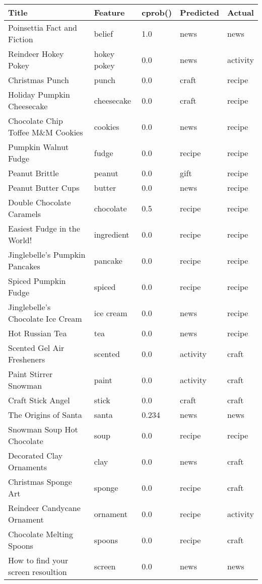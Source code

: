 \documentclass[letterpaper,11pt]{report}
\begin{document}
\begin{savenotes}
\begin{table}[htbp]
	\centering
    \begin{tabular}{|p{8cm}|l|l|l|l|}
    \hline
    \textbf{Title} & \textbf{Feature} & \textbf{cprob()} & \textbf{Predicted} & \textbf{Actual} \\ \hline
Poinsettia Fact and Fiction&belief&1.0&news&news\\ \hline
Reindeer Hokey Pokey&hokey pokey&0.0&news&activity\\ \hline
Christmas Punch&punch&0.0&craft&recipe\\ \hline
Holiday Pumpkin Cheesecake&cheesecake&0.0&craft&recipe\\ \hline
Chocolate Chip Toffee M\&M Cookies&cookies&0.0&news&recipe\\ \hline
Pumpkin Walnut Fudge&fudge&0.0&recipe&recipe\\ \hline
Peanut Brittle&peanut&0.0&gift&recipe\\ \hline
Peanut Butter Cups&butter&0.0&news&recipe\\ \hline
Double Chocolate Caramels&chocolate&0.5&recipe&recipe\\ \hline
Easiest Fudge in the World!&ingredient&0.0&recipe&recipe\\ \hline
Jinglebelle’s Pumpkin Pancakes&pancake&0.0&recipe&recipe\\ \hline
Spiced Pumpkin Fudge&spiced&0.0&recipe&recipe\\ \hline
Jinglebelle’s Chocolate Ice Cream&ice cream&0.0&news&recipe\\ \hline
Hot Russian Tea&tea&0.0&news&recipe\\ \hline
Scented Gel Air Fresheners&scented&0.0&activity&craft\\ \hline
Paint Stirrer Snowman&paint&0.0&activity&craft\\ \hline
Craft Stick Angel&stick&0.0&craft&craft\\ \hline
The Origins of Santa&santa&0.234&news&news\\ \hline
Snowman Soup Hot Chocolate&soup&0.0&recipe&recipe\\ \hline
Decorated Clay Ornaments&clay&0.0&news&craft\\ \hline
Christmas Sponge Art&sponge&0.0&recipe&craft\\ \hline
Reindeer Candycane Ornament&ornament&0.0&recipe&activity\\ \hline
Chocolate Melting Spoons&spoons&0.0&recipe&craft\\ \hline
How to find your screen resoultion&screen&0.0&news&news\\ \hline

\end{tabular}
\end{table}
\end{savenotes}
\end{document}
